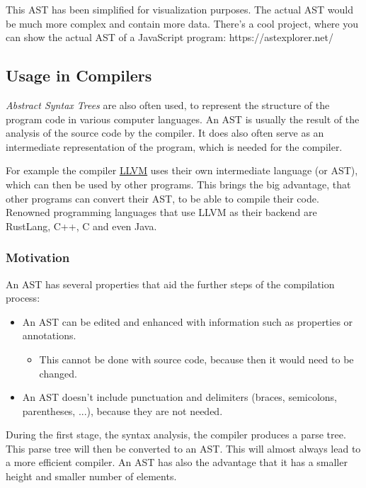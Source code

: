 This AST has been simplified for visualization purposes. The actual AST would be much more complex and contain more data. There's a cool project, where you can show the actual AST of a JavaScript program: https://astexplorer.net/

\subsection{Usage in Compilers}

\textit{Abstract Syntax Trees} are also often used, to represent the structure of the program code in various computer languages. An AST is usually the result of the analysis of the source code by the compiler. It does also often serve as an intermediate representation of the program, which is needed for the compiler. 

For example the compiler \href{https://llvm.org/}{LLVM} uses their own intermediate language (or AST), which can then be used by other programs. This brings the big advantage, that other programs can convert their AST, to be able to compile their code. Renowned programming languages that use LLVM as their backend are RustLang, C++, C and even Java. 

\subsubsection{Motivation}

An AST has several properties that aid the further steps of the compilation process:

\begin{itemize}
    \item An AST can be edited and enhanced with information such as properties or annotations.
    
    \begin{itemize}
        \item This cannot be done with source code, because then it would need to be changed. 
    \end{itemize}

    \item An AST doesn't include punctuation and delimiters (braces, semicolons, parentheses, ...), because they are not needed.
\end{itemize}

During the first stage, the syntax analysis, the compiler produces a parse tree. This parse tree will then be converted to an AST. This will almost always lead to a more efficient compiler. An AST has also the advantage that it has a smaller height and smaller number of elements. 

